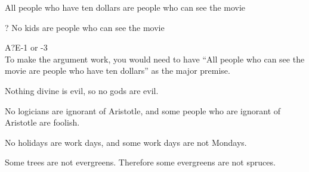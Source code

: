 {\begin{exercises}
{\begin{earg*}
\item All people who have ten dollars are people who can see the movie
\item ?
\itemc No kids are people who can see the movie
\end{earg*}
A?E-1 or -3 \vspace{6pt}\\
To make the argument work, you would need to have ``All people who can see the movie are people who have ten dollars'' as the major premise. 
} 


\item Nothing divine is evil, so no gods are evil.


\item No logicians are ignorant of Aristotle, and some people who are ignorant of Aristotle are foolish.


\item No holidays are work days, and some work days are not Mondays.


\item Some trees are not evergreens. Therefore some evergreens are not spruces.



\end{exercises}}
